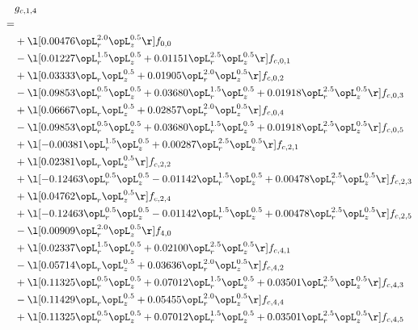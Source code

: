 \begin{alignat}{2} 
\label{eq:g_14_0} 
& g_{c,1,4} \nonumber \\ 
 = \\ 
& + \l[  0.00476 \opL_r^{2.0} \opL_z^{0.5}  \r] f_{0,0} \nonumber \\ 
& - \l[  0.01227 \opL_r^{1.5} \opL_z^{0.5} +  0.01151 \opL_r^{2.5} \opL_z^{0.5}  \r] f_{c,0,1} \nonumber \\ 
& + \l[  0.03333 \opL_r \opL_z^{0.5} +  0.01905 \opL_r^{2.0} \opL_z^{0.5}  \r] f_{c,0,2} \nonumber \\ 
& - \l[  0.09853 \opL_r^{0.5} \opL_z^{0.5} +  0.03680 \opL_r^{1.5} \opL_z^{0.5} +  0.01918 \opL_r^{2.5} \opL_z^{0.5}  \r] f_{c,0,3} \nonumber \\ 
& + \l[  0.06667 \opL_r \opL_z^{0.5} +  0.02857 \opL_r^{2.0} \opL_z^{0.5}  \r] f_{c,0,4} \nonumber \\ 
& - \l[  0.09853 \opL_r^{0.5} \opL_z^{0.5} +  0.03680 \opL_r^{1.5} \opL_z^{0.5} +  0.01918 \opL_r^{2.5} \opL_z^{0.5}  \r] f_{c,0,5} \nonumber \\ 
& + \l[  -0.00381 \opL_r^{1.5} \opL_z^{0.5} +  0.00287 \opL_r^{2.5} \opL_z^{0.5}  \r] f_{c,2,1} \nonumber \\ 
& + \l[  0.02381 \opL_r \opL_z^{0.5}  \r] f_{c,2,2} \nonumber \\ 
& + \l[  -0.12463 \opL_r^{0.5} \opL_z^{0.5}   -0.01142 \opL_r^{1.5} \opL_z^{0.5} +  0.00478 \opL_r^{2.5} \opL_z^{0.5}  \r] f_{c,2,3} \nonumber \\ 
& + \l[  0.04762 \opL_r \opL_z^{0.5}  \r] f_{c,2,4} \nonumber \\ 
& + \l[  -0.12463 \opL_r^{0.5} \opL_z^{0.5}   -0.01142 \opL_r^{1.5} \opL_z^{0.5} +  0.00478 \opL_r^{2.5} \opL_z^{0.5}  \r] f_{c,2,5} \nonumber \\ 
& - \l[  0.00909 \opL_r^{2.0} \opL_z^{0.5}  \r] f_{4,0} \nonumber \\ 
& + \l[  0.02337 \opL_r^{1.5} \opL_z^{0.5} +  0.02100 \opL_r^{2.5} \opL_z^{0.5}  \r] f_{c,4,1} \nonumber \\ 
& - \l[  0.05714 \opL_r \opL_z^{0.5} +  0.03636 \opL_r^{2.0} \opL_z^{0.5}  \r] f_{c,4,2} \nonumber \\ 
& + \l[  0.11325 \opL_r^{0.5} \opL_z^{0.5} +  0.07012 \opL_r^{1.5} \opL_z^{0.5} +  0.03501 \opL_r^{2.5} \opL_z^{0.5}  \r] f_{c,4,3} \nonumber \\ 
& - \l[  0.11429 \opL_r \opL_z^{0.5} +  0.05455 \opL_r^{2.0} \opL_z^{0.5}  \r] f_{c,4,4} \nonumber \\ 
& + \l[  0.11325 \opL_r^{0.5} \opL_z^{0.5} +  0.07012 \opL_r^{1.5} \opL_z^{0.5} +  0.03501 \opL_r^{2.5} \opL_z^{0.5}  \r] f_{c,4,5} \nonumber \\ 
\end{alignat} 


